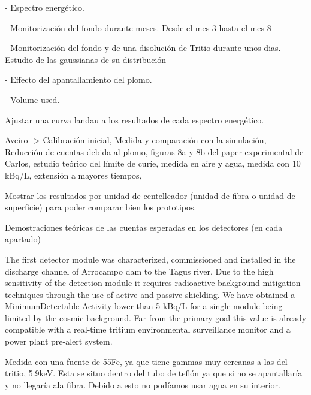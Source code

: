 - Espectro energético.

- Monitorización del fondo durante meses. Desde el mes 3 hasta el mes 8

- Monitorización del fondo y de una disolución de Tritio durante unos dias. Estudio de las gaussianas de su distribución 

- Effecto del apantallamiento del plomo.

- Volume used.


Ajustar una curva landau a los resultados de cada espectro energético.

Aveiro -> Calibración inicial, Medida y comparación con la simulación, Reducción de cuentas debida al plomo, figuras 8a y 8b del paper experimental de Carlos, estudio teórico del límite de curíe, medida en aire y agua, medida con 10 kBq/L, extensión a mayores tiempos,

Mostrar los resultados por unidad de centelleador (unidad de fibra o unidad de superficie) para poder comparar bien los prototipos.

Demostraciones teóricas de las cuentas esperadas en los detectores (en cada apartado)





The first detector module was characterized, commissioned and installed in the discharge channel of Arrocampo dam to the Tagus river. Due to the high sensitivity of the detection module it requires radioactive background mitigation techniques through the use of active and passive shielding. We have obtained a MinimumDetectable Activity lower than 5 kBq/L for a single module being limited by the cosmic background. Far from the primary goal this value is already compatible with a real-time tritium environmental surveillance monitor and a power plant pre-alert system.


Medida con una fuente de 55Fe, ya que tiene gammas muy cercanas a las del tritio, 5.9keV. Esta se situo dentro del tubo de teflón ya que si no se apantallaría y no llegaría  ala fibra. Debido a esto no podíamos usar agua en su interior.



